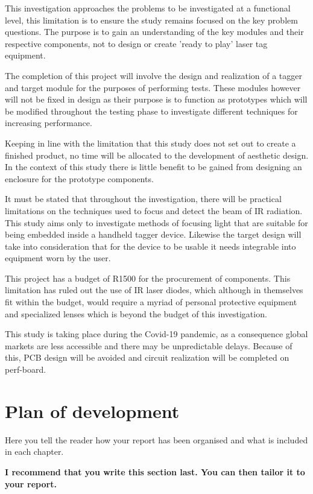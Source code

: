 This investigation approaches the problems to be investigated at a functional level, this limitation is to ensure the study remains focused on the key problem questions. The purpose is to gain an understanding of the key modules and their respective components, not to design or create 'ready to play' laser tag equipment.

The completion of this project will involve the design and realization of a tagger and target module for the purposes of performing tests. These modules however will not be fixed in design as their purpose is to function as prototypes which will be modified throughout the testing phase to investigate different techniques for increasing performance.

Keeping in line with the limitation that this study does not set out to create a finished product, no time will be allocated to the development of aesthetic design. In the context of this study there is little benefit to be gained from designing an enclosure for the prototype components.

It must be stated that throughout the investigation, there will be practical limitations on the techniques used to focus and detect the beam of IR radiation. This study aims only to investigate methods of focusing light that are suitable for being embedded inside a handheld tagger device. Likewise the target design will take into consideration that for the device to be usable it needs integrable into equipment worn by the user.

This project has a budget of R1500 for the procurement of components. This limitation has ruled out the use of IR laser diodes, which although in themselves fit within the budget, would require a myriad of personal protective equipment and specialized lenses which is beyond the budget of this investigation.

This study is taking place during the Covid-19 pandemic, as a consequence global markets are less accessible and there may be unpredictable delays. Because of this, PCB design will be avoided and circuit realization will be completed on perf-board.




\section{Plan of development}
Here you tell the reader how your report has been organised and what is included in each
chapter.

{\bf I recommend that you write this section last. You can then tailor it to your report.}
